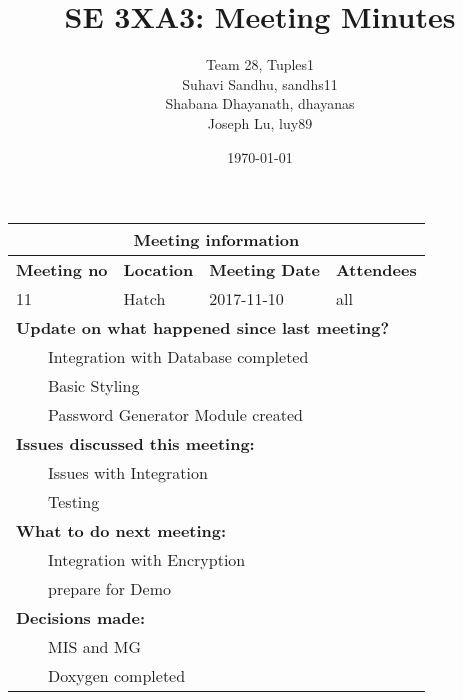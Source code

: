 \documentclass{article}
\title{SE 3XA3: Meeting Minutes}
\author{Team 28, Tuples1
		\\ Suhavi Sandhu, sandhs11
		\\ Shabana Dhayanath, dhayanas
		\\ Joseph Lu, luy89
}
\date{\today}
\newcommand{\tabitem}{~~\llap{\textbullet}~~}
\begin{document}
\begin{tabularx}{\textwidth}{| X || X || X || X |}

    \hline
    \hline
    \multicolumn{4}{|c|}{\textbf{Meeting information}}\\
    \hline
    \hline
        
    \textbf{Meeting no}& \textbf{Location}&\textbf{Meeting Date}&\textbf{Attendees}\\
    
    \hline

    11 & Hatch & 2017-11-10 & all\\
    
    \hline

    \multicolumn{4}{|l|}{\textbf{Update on what happened since last meeting?}}\\

    \multicolumn{4}{|l|}{\tabitem Integration with Database completed}\\
    \multicolumn{4}{|l|}{\tabitem Basic Styling}\\
    \multicolumn{4}{|l|}{\tabitem Password Generator Module created}\\

    \hline

    \multicolumn{4}{|l|}{\textbf{Issues discussed this meeting:}}\\
    
    \multicolumn{4}{|l|}{\tabitem Issues with Integration}\\
    \multicolumn{4}{|l|}{\tabitem Testing}\\

    \hline

    \multicolumn{4}{|l|}{\textbf{What to do next meeting:}}\\

    \multicolumn{4}{|l|}{\tabitem Integration with Encryption}\\
    \multicolumn{4}{|l|}{\tabitem prepare for Demo}\\

    \hline

    \multicolumn{4}{|l|}{\textbf{Decisions made:}}\\
    
    \multicolumn{4}{|l|}{\tabitem MIS and MG}\\
    \multicolumn{4}{|l|}{\tabitem Doxygen completed}\\

    \hline


\end{tabularx}
\end{document}
